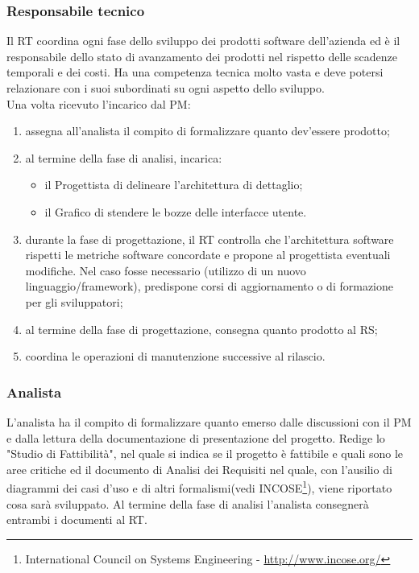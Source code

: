 \subsubsection{Responsabile tecnico}
Il RT coordina ogni fase dello sviluppo dei prodotti software dell\textquoteright{}azienda ed \`{e} il responsabile
dello stato di avanzamento dei prodotti nel rispetto delle scadenze temporali e
dei costi. Ha una competenza tecnica molto vasta e deve potersi
relazionare con i suoi subordinati su ogni aspetto dello sviluppo.\\
Una volta ricevuto l\textquoteright{}incarico dal PM:
\begin{enumerate}
\item assegna all\textquoteright{}analista il compito di formalizzare quanto dev\textquoteright{}essere prodotto;
\item al termine della fase di analisi, incarica:
\begin{itemize}
\item il Progettista di delineare l\textquoteright{}architettura di dettaglio;
\item il Grafico di stendere le bozze delle interfacce utente.
\end{itemize}
\item durante la fase di progettazione, il RT controlla che l\textquoteright{}architettura software rispetti
le metriche software concordate e propone al progettista eventuali modifiche. Nel
caso fosse necessario (utilizzo di un nuovo linguaggio/framework), predispone corsi
di aggiornamento o di formazione per gli sviluppatori;
\item al termine della fase di progettazione, consegna quanto prodotto al RS;
\item coordina le operazioni di manutenzione successive al rilascio.
\end{enumerate}

\subsubsection{Analista}
L\textquoteright{}analista ha il compito di formalizzare quanto emerso dalle discussioni con il PM e
dalla lettura della documentazione di presentazione del progetto. Redige lo "Studio di Fattibilit\`{a}", nel quale si indica se il progetto \`{e} fattibile e quali sono le aree critiche ed il documento di Analisi dei Requisiti nel quale, con l\textquoteright{}ausilio di diagrammi dei casi d\textquoteright{}uso e di altri formalismi(vedi INCOSE\footnote{International Council on Systems Engineering - \url{http://www.incose.org/}}), viene riportato cosa sar\`{a} sviluppato. Al termine della fase di analisi l\textquoteright{}analista consegner\`{a} entrambi i documenti al RT.

